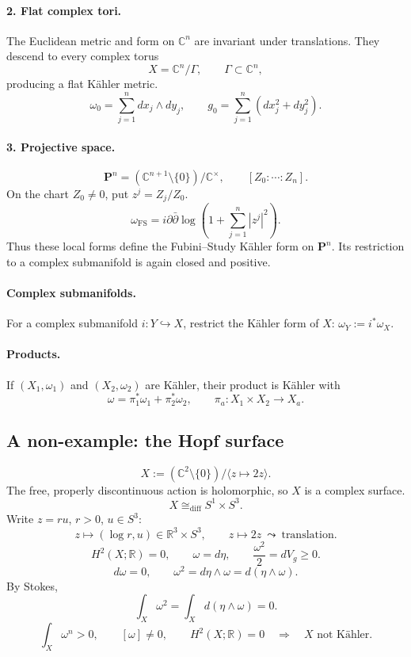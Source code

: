 \documentclass[11pt]{article}
\newcommand{\C}{\mathbb C}
\newcommand{\R}{\mathbb R}
\newcommand{\bdel}{\bar\partial}
\begin{document}
\paragraph{2. Flat complex tori.}
The Euclidean metric and form on $\C^n$ are invariant under translations.
They descend to every complex torus
\[
 X=\C^n/\Gamma,\qquad \Gamma\subset\C^n,
\]
producing a flat K\"ahler metric.
\[
 \omega_0=\sum_{j=1}^n dx_j\wedge dy_j,\qquad
 g_0=\sum_{j=1}^n(dx_j^2+dy_j^2).
\]

\paragraph{3. Projective space.}
\[
 \mathbf P^n=(\C^{n+1}\setminus\{0\})/\C^{\times},
 \qquad [Z_0:\cdots:Z_n].
\]
On the chart $Z_0\neq0$, put $z^j=Z_j/Z_0$.
\[
 \omega_{\mathrm{FS}}=i\partial\bdel
 \log\left(1+\sum_{j=1}^n|z^j|^2\right).
\]
Thus these local forms define the Fubini--Study K\"ahler form on
$\mathbf P^n$. Its restriction to a complex submanifold is again closed
and positive.

\paragraph{Complex submanifolds.}
For a complex submanifold $i:Y\hookrightarrow X$, restrict the K\"ahler
form of $X$: $\omega_Y:=i^*\omega_X$.

\paragraph{Products.}
If $(X_1,\omega_1)$ and $(X_2,\omega_2)$ are K\"ahler, their product is
K\"ahler with
\[
 \omega=\pi_1^*\omega_1+\pi_2^*\omega_2,
 \qquad\pi_a:X_1\times X_2\longrightarrow X_a.
\]

\subsection*{A non-example: the Hopf surface}
\[
 X:=(\C^2\setminus\{0\})/\langle z\mapsto2z\rangle.
\]
The free, properly discontinuous action is holomorphic, so $X$ is a
complex surface.
\[
 X\cong_{\mathrm{diff}}S^1\times S^3.
\]
Write $z=ru$, $r>0$, $u\in S^3$:
\[
 z\longmapsto(\log r,u)\in\R^3\times S^3,
 \qquad z\longmapsto2z\ \leadsto\ \text{translation}.
\]
\[
 H^2(X;\R)=0,\qquad \omega=d\eta,\qquad
 \frac{\omega^2}{2}=dV_g\geq0.
\]
\[
 d\omega=0,\qquad
 \omega^2=d\eta\wedge\omega=d(\eta\wedge\omega).
\]
By Stokes,
\[
 \int_X\omega^2=\int_Xd(\eta\wedge\omega)=0.
\]
\[
 \int_X\omega^n>0,\qquad [\omega]\neq0,\qquad H^2(X;\R)=0
 \quad\Longrightarrow\quad X\text{ not K\"ahler}.
\]
\end{document}
